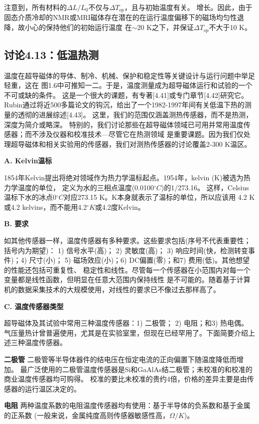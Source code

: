 注意到，所有材料的$\Delta L/L_0$不仅与$\Delta T_{op}$，且与初始温度有关。
增长。因此，由于固态介质冷却的NMR或MRI磁体存在潜在的在运行温度偏移下的磁场均匀性退降，故小心的保持他们的初始运行温度
在$\sim 20$ K之下，并保证$\Delta T_{op}$不大于10 K。

\subsection{讨论4.13：低温热测}
温度在超导磁体的导体、制冷、机械、保护和稳定性等关键设计与运行问题中举足轻重，这在
图1.6中可推知一二。于是，温度测量成为超导磁体运行和试验的一个不可或缺的条件。
这是一个很大的课题，有专著[4.41]或专门章节[4.42]研究它。
Rubin通过将近500多篇论文的钩沉，给出了一个1982-1997年间有关低温下热的测量的透彻的进展综述[4.43]。
这里，我们的范围仅涵盖测热传感器，而不是热测，深度为简介或略深。
特别的，我们讨论那些在超导磁体领域已可用并常用温度传感器；而不涉及仪器和校准技术---尽管它在热测领域
是重要课题。因为我们仅处理超导磁体和相关实验用的传感器，我们对测热传感器的讨论覆盖2-300 K温区。

\textbf{A. Kelvin温标}

1854年Kelvin提出将绝对领域作为热力学温标起点。1954年，kelvin (K)被选为热力学温度的单位，
定义为水的三相点温度(0.0100$^\circ C$)的1/273.16。
这样，Celsius温标下水的冰点0$^\circ C$对应273.15 K。K本身就表示了温标的单位，所以应该用
4.2 K或4.2 kelvins，而不能用4.2$^\circ K$或4.2度Kelvin。

\textbf{B. 要求}

如其他传感器一样，温度传感器有多种要求。这些要求包括(序号不代表重要性；括号内为期望)：
1) 信号水平(高)； 2) 灵敏度(高)； 3) 响应时间(快，检测转变事件)；4) 尺寸(小)；
5) 磁场效应(小)；6) DC偏置(零)；和7) 费用(低)。其他想望的性能还包括可重复性、
稳定性和线性。尽管每一个传感器在小范围内对每一个变量都是线性函数，但明显在任意大范围内保持线性
是不可能的。随着基于计算机的数据采集技术的大规模使用，对线性的要求已不像过去那样高了。

\textbf{C. 温度传感器类型}

超导磁体及其试验中常用三种温度传感器：1) 二极管； 2) 电阻；和3) 热电偶。
气压量热计曾普遍使用，尤其是在实验室里，但现在已经罕用了。下面简要介绍上述三种温度传感器。

\textbf{二极管} 二极管等半导体器件的结电压在恒定电流的正向偏置下随温度降低而增加。
最广泛使用的二极管温度传感器是Si和GaAlAs结二极管；未校准的和校准的商业温度传感器均可购得。
校准的要比未校准的贵约4倍，价格的差异主要是由传感器的运行温区决定的。

\textbf{电阻} 两种温度系数的电阻温度传感器均有使用：基于半导体的负系数和基于金属的正系数
(一般来说，金属纯度高则传感器敏感性高，$\Omega/K$)。

